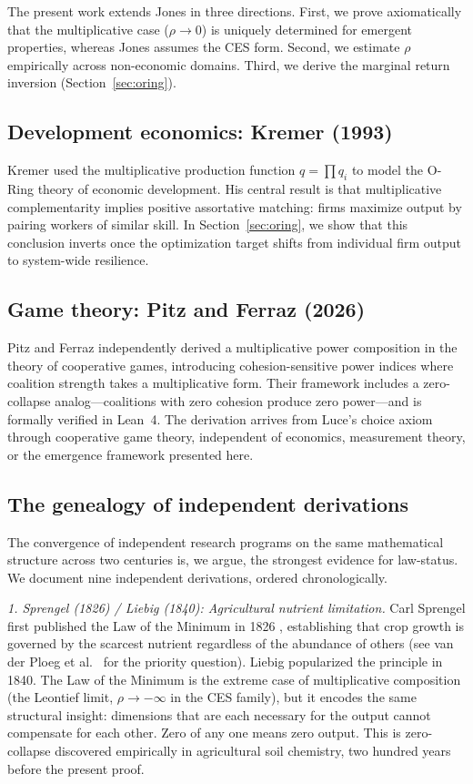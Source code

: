 \documentclass[12pt, a4paper]{article}
\theoremstyle{definition}
\theoremstyle{remark}
\begin{document}
The present work extends Jones in three directions. First, we prove axiomatically that the multiplicative case ($\rho \to 0$) is uniquely determined for emergent properties, whereas Jones assumes the CES form. Second, we estimate $\rho$ empirically across non-economic domains. Third, we derive the marginal return inversion (Section~\ref{sec:oring}).

\subsection{Development economics: Kremer (1993)}

Kremer \cite{kremer1993} used the multiplicative production function $q = \prod q_i$ to model the O-Ring theory of economic development. His central result is that multiplicative complementarity implies positive assortative matching: firms maximize output by pairing workers of similar skill. In Section~\ref{sec:oring}, we show that this conclusion inverts once the optimization target shifts from individual firm output to system-wide resilience.

\subsection{Game theory: Pitz and Ferraz (2026)}

Pitz and Ferraz \cite{pitz2026} independently derived a multiplicative power composition in the theory of cooperative games, introducing cohesion-sensitive power indices where coalition strength takes a multiplicative form. Their framework includes a zero-collapse analog---coalitions with zero cohesion produce zero power---and is formally verified in Lean~4. The derivation arrives from Luce's choice axiom through cooperative game theory, independent of economics, measurement theory, or the emergence framework presented here.

\subsection{The genealogy of independent derivations}\label{sec:genealogy}

The convergence of independent research programs on the same mathematical structure across two centuries is, we argue, the strongest evidence for law-status. We document nine independent derivations, ordered chronologically.

\textit{1. Sprengel (1826) / Liebig (1840): Agricultural nutrient limitation.} Carl Sprengel first published the Law of the Minimum in 1826 \cite{sprengel1826}, establishing that crop growth is governed by the scarcest nutrient regardless of the abundance of others (see van der Ploeg et al.\ \cite{vanderploeg1999} for the priority question). Liebig popularized the principle in 1840. The Law of the Minimum is the extreme case of multiplicative composition (the Leontief limit, $\rho \to -\infty$ in the CES family), but it encodes the same structural insight: dimensions that are each necessary for the output cannot compensate for each other. Zero of any one means zero output. This is zero-collapse discovered empirically in agricultural soil chemistry, two hundred years before the present proof.
\end{document}
